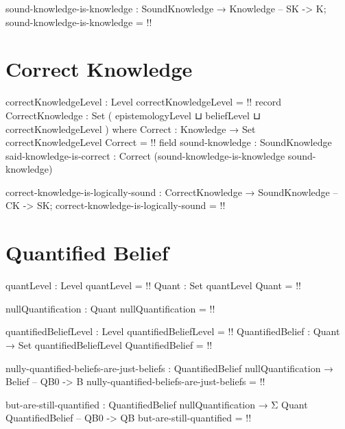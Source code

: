 \documentclass{article}
\begin{document}
\begin{code}
sound-knowledge-is-knowledge : SoundKnowledge → Knowledge -- SK -> K;
sound-knowledge-is-knowledge = {!!}
\end{code}

\section{Correct Knowledge}

\begin{code}
correctKnowledgeLevel : Level
correctKnowledgeLevel = {!!}
record CorrectKnowledge : Set ( epistemologyLevel
                              ⊔ beliefLevel
                              ⊔ correctKnowledgeLevel
                              ) where
  Correct : Knowledge → Set correctKnowledgeLevel
  Correct = {!!}
  field
    sound-knowledge : SoundKnowledge
    said-knowledge-is-correct :
      Correct (sound-knowledge-is-knowledge sound-knowledge)
\end{code}

\begin{code}
correct-knowledge-is-logically-sound :
  CorrectKnowledge → SoundKnowledge -- CK -> SK;
correct-knowledge-is-logically-sound = {!!}
\end{code}

\section{Quantified Belief}

\begin{code}
quantLevel : Level
quantLevel = {!!}
Quant : Set quantLevel
Quant = {!!}
\end{code}

\begin{code}
nullQuantification : Quant
nullQuantification = {!!}
\end{code}

\begin{code}
quantifiedBeliefLevel : Level
quantifiedBeliefLevel = {!!}
QuantifiedBelief : Quant → Set quantifiedBeliefLevel
QuantifiedBelief = {!!}
\end{code}

\begin{code}
nully-quantified-beliefs-are-just-beliefs :
  QuantifiedBelief nullQuantification → Belief -- QB0 -> B
nully-quantified-beliefs-are-just-beliefs = {!!}
\end{code}

\begin{code}
but-are-still-quantified :
  QuantifiedBelief nullQuantification →
  Σ Quant QuantifiedBelief -- QB0 -> QB
but-are-still-quantified = {!!}
\end{code}
\end{document}
